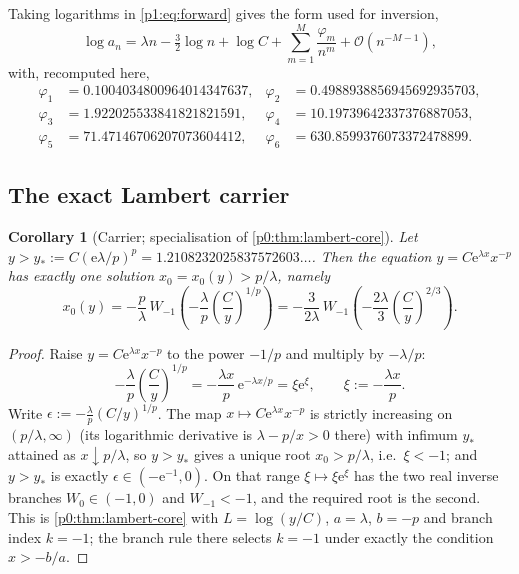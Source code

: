 \documentclass[11pt,a4paper,oneside]{book}
\theoremstyle{plain}
\newtheorem{corollary}[theorem]{Corollary}
\theoremstyle{definition}
\theoremstyle{remark}
\newcommand{\e}{\mathrm{e}}
\newcommand{\bigO}{\mathcal{O}}
\newcommand{\Wlam}{W}
\begin{document}
Taking logarithms in \cref{p1:eq:forward} gives the form used for inversion,
\begin{equation}
 \log a_n=\lambda n-\tfrac32\log n+\log C
 +\sum_{m=1}^{M}\frac{\varphi_m}{n^{m}}+\bigO(n^{-M-1}),
 \label{p1:eq:log-a}
\end{equation}
with, recomputed here,
\begin{equation}
\begin{aligned}
 \varphi_1&=0.1004034800964014347637,&
 \varphi_2&=0.4988938856945692935703,\\
 \varphi_3&=1.922025533841821821591,&
 \varphi_4&=10.19739642337376887053,\\
 \varphi_5&=71.47146706207073604412,&
 \varphi_6&=630.8599376073372478899 .
\end{aligned}
\label{p1:eq:phi-numeric}
\end{equation}

\subsection{The exact Lambert carrier}

\begin{corollary}[Carrier; specialisation of \cref{p0:thm:lambert-core}]
\label{p1:cor:carrier}
Let $y>y_\ast:=C\left(\e\lambda/p\right)^{p} =1.2108232025837572603\ldots$. Then the equation
$y=C\e^{\lambda x}x^{-p}$ has exactly one solution $x_0=x_0(y)>p/\lambda$, namely
\begin{equation}
 \boxed{\;
 x_0(y)=-\frac p\lambda\,
 \Wlam_{-1}\!\left(-\frac\lambda p\left(\frac Cy\right)^{1/p}\right)
 =-\frac{3}{2\lambda}\,
 \Wlam_{-1}\!\left(-\frac{2\lambda}{3}\left(\frac Cy\right)^{2/3}\right).\;}
 \label{p1:eq:carrier}
\end{equation}
\end{corollary}

\begin{proof}
Raise $y=C\e^{\lambda x}x^{-p}$ to the power $-1/p$ and multiply by $-\lambda/p$:
\[
-\frac\lambda p\left(\frac Cy\right)^{1/p} =-\frac{\lambda x}{p}\,\e^{-\lambda x/p}
=\xi\e^{\xi},\qquad \xi:=-\frac{\lambda x}{p}.
\]
Write $\epsilon:=-\frac\lambda p(C/y)^{1/p}$.  The map $x\mapsto C\e^{\lambda x}x^{-p}$ is
strictly increasing on $(p/\lambda,\infty)$ (its logarithmic derivative is $\lambda-p/x>0$
there) with infimum $y_\ast$ attained as $x\downarrow p/\lambda$, so $y>y_\ast$ gives a unique
root $x_0>p/\lambda$, i.e.\ $\xi<-1$; and $y>y_\ast$ is exactly $\epsilon\in(-\e^{-1},0)$.  On
that range $\xi\mapsto\xi\e^{\xi}$ has the two real inverse branches $\Wlam_0\in(-1,0)$ and
$\Wlam_{-1}<-1$, and the required root is the second. This is \cref{p0:thm:lambert-core} with
$L=\log(y/C)$, $a=\lambda$, $b=-p$ and branch index $k=-1$; the branch rule there selects
$k=-1$ under exactly the condition $x>-b/a$.
\end{proof}
\end{document}
